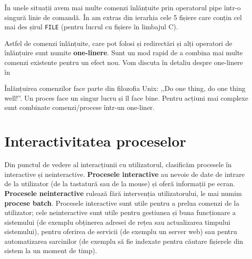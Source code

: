 În unele situații avem mai multe comenzi înlănțuite prin operatorul pipe într-o singură linie de comandă.
În  am extras din ierarhia  cele 5 fișiere care conțin cel mai des șirul \texttt{FILE} (pentru lucrul cu fișiere în limbajul C).


Astfel de comenzi înlănțuite, care pot folosi și redirectări și alți operatori de înlănțuire sunt numite \textbf{one-linere}.
Sunt un mod rapid de a combina mai multe comenzi existente pentru un efect nou.
Vom discuta în detaliu despre one-linere în 

\begin{note}
  Înlănțuirea comenzilor face parte din filozofia Unix: ,,Do one thing, do one thing well!''.
  Un proces face un singur lucru și îl face bine.
  Pentru acțiuni mai complexe sunt combinate comenzi/procese într-un one-liner.
\end{note}

\section{Interactivitatea proceselor}
\label{sec:process:interactivity}

Din punctul de vedere al interacțiunii cu utilizatorul, clasificăm procesele în interactive și neinteractive.
\textbf{Procesele interactive} au nevoie de date de intrare de la utilizator (de la tastatură sau de la mouse) și oferă informații pe ecran.
\textbf{Procesele neinteractive} rulează fără intervenția utilizatorului, le mai numim \textbf{procese batch}.
Procesele interactive sunt utile pentru a prelua comenzi de la utilizator;
cele neinteractive sunt utile pentru gestiunea și buna funcționare a sistemului (de exemplu obținerea adresei de rețea sau actualizarea timpului sistemului), pentru oferirea de servicii (de exemplu un server web) sau pentru automatizarea sarcinilor (de exemplu să fie indexate pentru căutare fișierele din sistem la un moment de timp).

